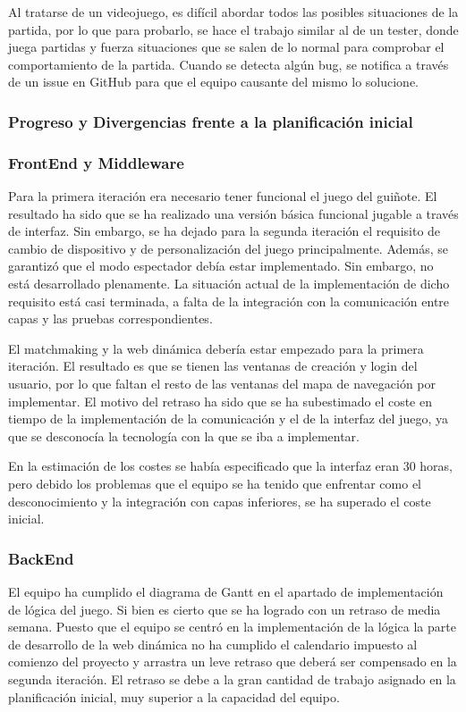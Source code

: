 Al tratarse de un videojuego, es difícil abordar todos las posibles situaciones de la partida, por lo que para probarlo, se hace el trabajo similar al de un tester, donde juega partidas y fuerza situaciones que se salen de lo normal para comprobar el comportamiento de la partida. Cuando se detecta algún bug, se notifica a través de un issue en GitHub para que el equipo causante del mismo lo solucione.



\subsubsection*{Progreso y Divergencias frente a la planificación inicial}
\subsubsection*{FrontEnd y Middleware}
Para la primera iteración era necesario tener funcional el juego del guiñote. El resultado ha sido que se ha realizado una versión básica funcional jugable a través de interfaz. Sin embargo, se ha dejado para la segunda iteración el requisito de cambio de dispositivo y de personalización del juego principalmente. Además, se garantizó que el modo espectador debía estar implementado. Sin embargo, no está desarrollado plenamente. La situación actual de la implementación de dicho requisito está casi terminada, a falta de la integración con la comunicación entre capas y las pruebas correspondientes.

El matchmaking y la web dinámica debería estar empezado para la primera iteración. El resultado es que se tienen las ventanas de creación y login del usuario, por lo que faltan el resto de las ventanas del mapa de navegación por implementar. El motivo del retraso ha sido que se ha subestimado el coste en tiempo de la implementación de la comunicación y el de la interfaz del juego, ya que se desconocía la tecnología con la que se iba a implementar.

En la estimación de los costes se había especificado que la interfaz eran 30 horas, pero debido los problemas que el equipo se ha tenido que enfrentar como el desconocimiento y la integración con capas inferiores, se ha superado el coste inicial.

\subsubsection*{BackEnd}
El equipo ha cumplido el diagrama de Gantt en el apartado de implementación de lógica del juego. Si bien es cierto que se ha logrado con un retraso de media semana. Puesto que el equipo se centró en la implementación de la lógica la parte de desarrollo de la web dinámica no ha cumplido el calendario impuesto al comienzo del proyecto y arrastra un leve retraso que deberá ser compensado en la segunda iteración. El retraso se debe a la gran cantidad de trabajo asignado en la planificación inicial, muy superior a la capacidad del equipo.

